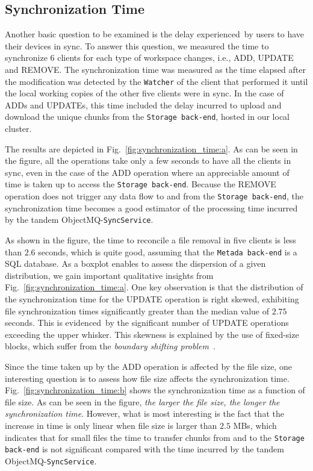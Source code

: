 \subsection{Synchronization Time}

Another basic question to be examined is the delay experienced~by users to have their devices in sync. 
To answer this question, we measured the time to synchronize $6$ clients for each type
of workspace changes, i.e., ADD, UPDATE and REMOVE. 
The synchronization time was measured as the time elapsed after the modification
was detected by the \texttt{Watcher} of the client that performed it until the local working copies of the other
five clients were in sync. In the case of ADDs and UPDATEs, this time included the delay incurred
to upload and download the unique chunks from the \texttt{Storage back-end}, hosted in our local cluster. 

The results are depicted in Fig.~\ref{fig:synchronization_time:a}. As can be seen in the figure, all the operations take
only a few seconds to have all the clients in sync, even in the case of the ADD operation where an appreciable
amount of time is taken up to access the \texttt{Storage back-end}. Because the REMOVE operation does not trigger any data flow to and from the
\texttt{Storage back-end}, the synchronization time becomes a good estimator of the processing time
incurred by the tandem ObjectMQ-\texttt{SyncService}. 

As shown in the figure, the time to reconcile
a file removal in five clients is less than $2.6$ seconds, which is quite good, assuming that the
\texttt{Metada back-end} is a SQL database.
As a boxplot enables to assess the dispersion of a given distribution, 
we gain important qualitative
insights from Fig.~\ref{fig:synchronization_time:a}. One key observation is that the distribution of the
synchronization time for the UPDATE operation is right skewed, exhibiting file synchronization times
significantly greater than the median value of $2.75$ seconds. This is evidenced~by
the significant number of UPDATE operations exceeding the upper whisker. This skewness is explained
by the use of fixed-size blocks, which suffer from the \textit{boundary shifting problem}~\cite{Eshghi05}.

Since the time taken up by the ADD operation is affected by the file size, one interesting question
is to assess how file size affects the synchronization time. Fig.~\ref{fig:synchronization_time:b} shows the synchronization
time as a function of file size. As can be seen in the figure, \textit{the larger the file size, the longer
the synchronization time}. However, what is most interesting is the fact that the increase in time
is only linear when file size is larger than $2.5$ MBs, which indicates that for small files the
time to transfer chunks from and to the \texttt{Storage back-end} is not significant compared
with the time incurred by the tandem ObjectMQ-\texttt{SyncService}. 

